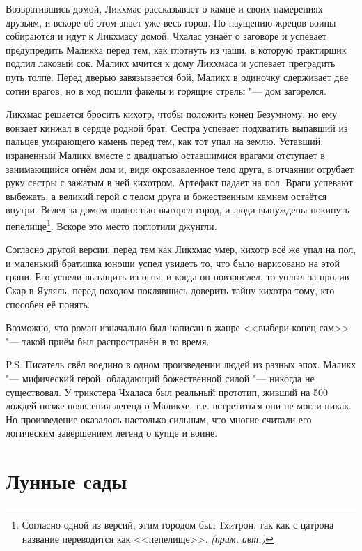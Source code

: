 \documentclass[a4paper,10pt,fleqn]{book}
\newcommand{\authornote}{\textit{(прим. авт.)}}
\begin{document}
Возвратившись домой, Ликхмас рассказывает о камне и своих намерениях друзьям, и вскоре об этом знает уже весь город.
По наущению жрецов воины собираются и идут к Ликхмасу домой.
Чхалас узнаёт о заговоре и успевает предупредить Маликха перед тем, как глотнуть из чаши, в которую трактирщик подлил лаковый сок.
Маликх мчится к дому Ликхмаса и успевает преградить путь толпе.
Перед дверью завязывается бой, Маликх в одиночку сдерживает две сотни врагов, но в ход пошли факелы и горящие стрелы "--- дом загорелся.

Ликхмас решается бросить кихотр, чтобы положить конец Безумному, но ему вонзает кинжал в сердце родной брат.
Сестра успевает подхватить выпавший из пальцев умирающего камень перед тем, как тот упал на землю.
Уставший, израненный Маликх вместе с двадцатью оставшимися врагами отступает в занимающийся огнём дом и, видя окровавленное тело друга, в отчаянии отрубает руку сестры с зажатым в ней кихотром.
Артефакт падает на пол.
Враги успевают выбежать, а великий герой с телом друга и божественным камнем остаётся внутри.
Вслед за домом полностью выгорел город, и люди вынуждены покинуть пепелище\footnote
{Согласно одной из версий, этим городом был Тхитрон, так как с цатрона название переводится как <<пепелище>>. \authornote}.
Вскоре это место поглотили джунгли.

Согласно другой версии, перед тем как Ликхмас умер, кихотр всё же упал на пол, и маленький братишка юноши успел увидеть то, что было нарисовано на этой грани.
Его успели вытащить из огня, и когда он повзрослел, то уплыл за пролив Скар в Яуляль, перед походом поклявшись доверить тайну кихотра тому, кто способен её понять.

Возможно, что роман изначально был написан в жанре <<выбери конец сам>> "--- такой приём был распространён в то время.

P.S. Писатель свёл воедино в одном произведении людей из разных эпох.
Маликх "--- мифический герой, обладающий божественной силой "--- никогда не существовал.
У трикстера Чхаласа был реальный прототип, живший на 500 дождей позже появления легенд о Маликхе, т.е. встретиться они не могли никак.
Но произведение оказалось настолько сильным, что многие считали его логическим завершением легенд о купце и воине.

\section{Лунные сады}
\end{document}
